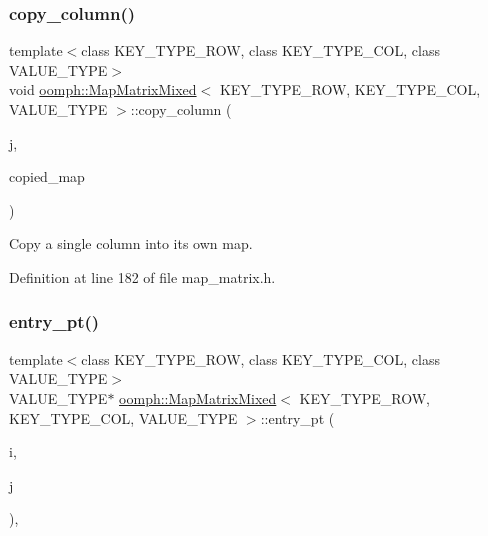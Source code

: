\subsubsection{\texorpdfstring{copy\+\_\+column()}{copy\_column()}}
{\footnotesize\ttfamily template$<$class K\+E\+Y\+\_\+\+T\+Y\+P\+E\+\_\+\+R\+OW, class K\+E\+Y\+\_\+\+T\+Y\+P\+E\+\_\+\+C\+OL, class V\+A\+L\+U\+E\+\_\+\+T\+Y\+PE$>$ \\
void \hyperlink{classoomph_1_1MapMatrixMixed}{oomph\+::\+Map\+Matrix\+Mixed}$<$ K\+E\+Y\+\_\+\+T\+Y\+P\+E\+\_\+\+R\+OW, K\+E\+Y\+\_\+\+T\+Y\+P\+E\+\_\+\+C\+OL, V\+A\+L\+U\+E\+\_\+\+T\+Y\+PE $>$\+::copy\+\_\+column (\begin{DoxyParamCaption}\item[{const K\+E\+Y\+\_\+\+T\+Y\+P\+E\+\_\+\+C\+OL \&}]{j,  }\item[{std\+::map$<$ K\+E\+Y\+\_\+\+T\+Y\+P\+E\+\_\+\+R\+OW, V\+A\+L\+U\+E\+\_\+\+T\+Y\+PE $>$ \&}]{copied\+\_\+map }\end{DoxyParamCaption})\hspace{0.3cm}{\ttfamily [inline]}}



Copy a single column into its own map. 



Definition at line 182 of file map\+\_\+matrix.\+h.

\mbox{\label{classoomph_1_1MapMatrixMixed_a964536bfab6dc7426ddcdca07fe25d12}} 
\subsubsection{\texorpdfstring{entry\+\_\+pt()}{entry\_pt()}}
{\footnotesize\ttfamily template$<$class K\+E\+Y\+\_\+\+T\+Y\+P\+E\+\_\+\+R\+OW, class K\+E\+Y\+\_\+\+T\+Y\+P\+E\+\_\+\+C\+OL, class V\+A\+L\+U\+E\+\_\+\+T\+Y\+PE$>$ \\
V\+A\+L\+U\+E\+\_\+\+T\+Y\+PE$\ast$ \hyperlink{classoomph_1_1MapMatrixMixed}{oomph\+::\+Map\+Matrix\+Mixed}$<$ K\+E\+Y\+\_\+\+T\+Y\+P\+E\+\_\+\+R\+OW, K\+E\+Y\+\_\+\+T\+Y\+P\+E\+\_\+\+C\+OL, V\+A\+L\+U\+E\+\_\+\+T\+Y\+PE $>$\+::entry\+\_\+pt (\begin{DoxyParamCaption}\item[{const K\+E\+Y\+\_\+\+T\+Y\+P\+E\+\_\+\+R\+OW \&}]{i,  }\item[{const K\+E\+Y\+\_\+\+T\+Y\+P\+E\+\_\+\+C\+OL \&}]{j }\end{DoxyParamCaption})\hspace{0.3cm}{\ttfamily [inline]}, {\ttfamily [protected]}}



